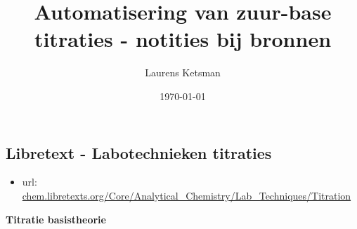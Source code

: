 \documentclass[10pt]{report}
\author{Laurens Ketsman}
\title{Automatisering van zuur-base titraties - notities bij bronnen}
\date{\today}
\begin{document}
\clearpage\maketitle
\thispagestyle{empty}
\newpage


\subsection{Libretext - Labotechnieken titraties}
\begin{itemize}
    \item url: \url{chem.libretexts.org/Core/Analytical_Chemistry/Lab_Techniques/Titration}
\end{itemize}
\textbf{Titratie basistheorie}
\end{document}
